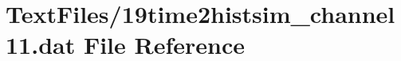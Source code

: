 \hypertarget{19time2histsim__channel11_8dat}{}\section{Text\+Files/19time2histsim\+\_\+channel11.dat File Reference}
\label{19time2histsim__channel11_8dat}
